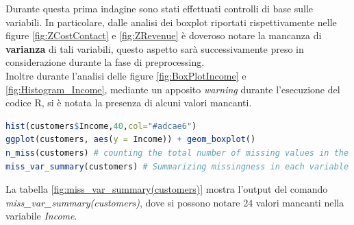 \documentclass[letterpaper,11pt]{article}
\begin{document}
Durante questa prima indagine sono stati effettuati controlli di base sulle variabili. In particolare, dalle analisi dei boxplot riportati rispettivamente nelle figure \ref{fig:ZCostContact} e \ref{fig:ZRevenue} è doveroso notare la mancanza di \textbf{varianza} di tali variabili, questo aspetto sarà successivamente preso in considerazione durante la fase di preprocessing.\\ Inoltre durante l'analisi delle figure \ref{fig:BoxPlotIncome} e \ref{fig:Histogram_Income}, mediante un apposito \textit{warning} durante l'esecuzione del codice R, si è notata la presenza di alcuni valori mancanti.
\begin{lstlisting}[language=R]
hist(customers$Income,40,col="#adcae6")
ggplot(customers, aes(y = Income)) + geom_boxplot()
n_miss(customers) # counting the total number of missing values in the data
miss_var_summary(customers) # Summarizing missingness in each variable 
\end{lstlisting}
La tabella \ref{fig:miss_var_summary(customers)} mostra l'output del comando \textit{miss\_var\_summary(customers)}, dove si possono notare 24 valori mancanti nella variabile \textit{Income}.
\end{document}
